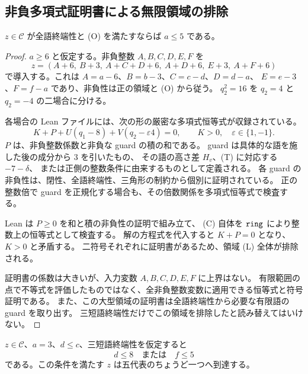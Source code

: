 \subsection{非負多項式証明書による無限領域の排除}

\begin{proposition}[順序付き終端元の第一成分は $5$ 以下]
\label{bp:pos-large}
\leanok
$z\in\mathcal C$ が全語終端性と (O) を満たすならば $a\leq5$ である。
\end{proposition}

\begin{proof}
\leanok
$a\geq6$ と仮定する。非負整数 $A,B,C,D,E,F$ を
\[
 z=(A+6,\ B+3,\ A+C+D+6,\ A+D+6,\ E+3,\ A+F+6)
 \tag{L}
\]
で導入する。これは $A=a-6$、$B=b-3$、$C=c-d$、$D=d-a$、
$E=e-3$、$F=f-a$ であり、非負性は正の領域と (O) から従う。
$q_2^2=16$ を $q_2=4$ と $q_2=-4$ の二場合に分ける。

各場合の Lean ファイルには、次の形の厳密な多項式恒等式が収録されている。
\[
 K+P+U(q_1-8)+V(q_2-\varepsilon4)=0,
 \qquad K>0,\quad\varepsilon\in\{1,-1\}.
 \tag{C}
\]
$P$ は、非負整数係数と非負な guard の積の和である。
guard は具体的な語を施した後の成分から $3$ を引いたもの、
その語の高さ差 $H_v$、(T) に対応する $-7-\delta$、
または正側の整数条件に由来するものとして定義される。
各 guard の非負性は、閉性、全語終端性、三角形の制約から個別に証明されている。
正の整数倍で guard を正規化する場合も、その倍数関係を多項式恒等式で検査する。

Lean は $P\geq0$ を和と積の非負性の証明で組み立て、
(C) 自体を $\texttt{ring}$ により整数上の恒等式として検査する。
解の方程式を代入すると $K+P=0$ となり、$K>0$ と矛盾する。
二符号それぞれに証明書があるため、領域 (L) 全体が排除される。

証明書の係数は大きいが、入力変数 $A,B,C,D,E,F$ に上界はない。
有限範囲の点で不等式を評価したものではなく、全非負整数変数に適用できる恒等式と符号証明である。
また、この大型領域の証明書は全語終端性から必要な有限語の guard を取り出す。
三短語終端性だけでこの領域を排除したと読み替えてはいけない。
\end{proof}

\begin{proposition}
\label{bp:pos-three}
\leanok
$z\in\mathcal C$、$a=3$、$d\leq c$、三短語終端性を仮定すると
\[
 d\leq8\quad\text{または}\quad f\leq5
\]
である。この条件を満たす $z$ は五代表のちょうど一つへ到達する。
\end{proposition}


